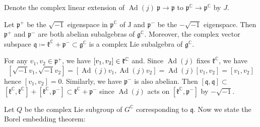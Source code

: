 Denote the complex linear extension of $\operatorname{Ad}(j)\:
\mathfrak{p} \rightarrow \mathfrak{p}$ to
$\mathfrak{p}^{\mathbb{C}} \rightarrow \mathfrak{p}^{\mathbb{C}}$
by $J$.
\begin{lemma}
	Let $\mathfrak{p}^{+}$ be the $\sqrt{-1}$ eigenspace in
	$\mathfrak{p}^{\mathbb{C}}$ of $\mathrm{J}$ and
	$\mathfrak{p}^{-}$ be the $-\sqrt{-1}$ eigenspace. Then
	$\mathfrak{p}^{+}$ and $\mathfrak{p}^{-}$ are both abelian
	subalgebras of $\mathfrak{g}^{\mathbb{C}}$. Moreover, the
	complex vector subspace
	$\mathfrak{q}\coloneq \mathfrak{k}^{\mathbb{C}}+\mathfrak{p}^{-}
	\subset \mathfrak{g}^{\mathbb{C}}$ is a complex Lie
	subalgebra of $\mathfrak{g}^{\mathbb{C}}$.
\end{lemma}
\bproof

For any $v_{1}, v_{2} \in \mathfrak{p}^{+}$, we have
$\left[v_{1}, v_{2}\right] \in {\mathfrak k}^{\mathbb{C}}$ and. Since
$\operatorname{Ad}(j)$ fixes $\mathfrak{k}^{\mathbb{C}}$, we have
\[
\left[\sqrt{-1} v_{1}, \sqrt{-1}
v_{2}\right]=\left[\operatorname{Ad}(j) v_{1},
\operatorname{Ad}(j)
v_{2}\right]=\operatorname{Ad}(j)\left[v_{1},
v_{2}\right]=\left[v_{1}, v_{2}\right]
\]
hence $\left[v_{1}, v_{2}\right]=0 .$ Similarly, we have
$\mathfrak{p}^{-}$ is also abelian. Then $[\mathfrak q, \mathfrak
q] \subset$ $\left[\mathfrak{k}^{\mathbb{C}},
\mathfrak{k}^{\mathbb{C}}\right]+\left[\mathfrak{k}^{\mathbb{C}},
\mathfrak{p}^{-}\right] \subset
\mathfrak{k}^{\mathbb{C}}+\mathfrak{p}^{-}$ since
$\operatorname{Ad}(j)$ acts on $\left[\mathfrak{k}^{\mathbb{C}},
\mathfrak{p}^{-}\right]$ by $-\sqrt{-1}$.
\eproof



Let $Q$ be the complex Lie subgroup of $G^{\mathbb{C}}$
corresponding to $\mathfrak{q}$. Now we state  the Borel
embedding theorem:

